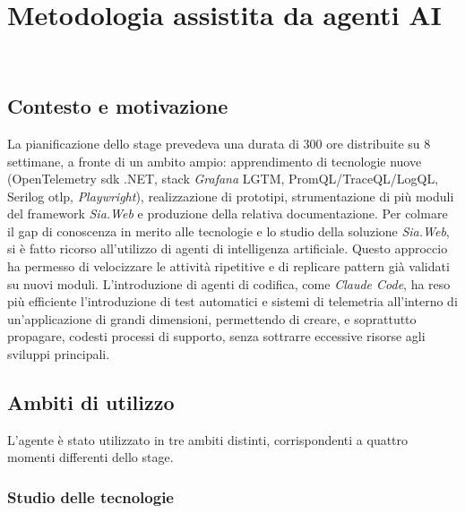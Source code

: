 \chapter{Metodologia assistita da agenti AI}
\label{cap:metodologia-ai}

\\

\section{Contesto e motivazione}

La pianificazione dello stage prevedeva una durata di 300 ore distribuite su 8 settimane,
a fronte di un ambito ampio: apprendimento di tecnologie nuove (OpenTelemetry \gls{sdk} .NET,
stack \emph{Grafana} LGTM, PromQL/TraceQL/LogQL, Serilog \gls{otlp}, \emph{Playwright}), realizzazione
di prototipi, strumentazione di più moduli del framework \emph{Sia.Web} e produzione della
relativa documentazione. Per colmare il gap di conoscenza in merito alle tecnologie e lo studio
della soluzione \emph{Sia.Web}, si è fatto ricorso all’utilizzo di agenti di intelligenza artificiale.
Questo approccio ha permesso di velocizzare le attività ripetitive e di replicare pattern già validati su nuovi moduli.
L'introduzione di agenti di codifica, come \emph{Claude Code}, ha reso più efficiente l'introduzione
di test automatici e sistemi di telemetria all’interno di un’applicazione di grandi dimensioni,
permettendo di creare, e soprattutto propagare, codesti processi di supporto, senza sottrarre eccessive risorse agli sviluppi principali.

\section{Ambiti di utilizzo}

L'agente è stato utilizzato in tre ambiti distinti, corrispondenti a quattro momenti differenti
dello stage.

\subsection{Studio delle tecnologie}

